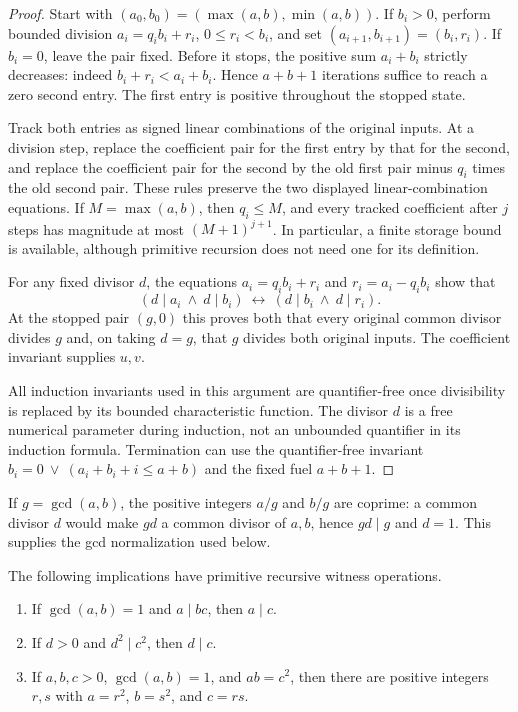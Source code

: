 \begin{proof}
Start with $(a_0,b_0)=(\max(a,b),\min(a,b))$.  If $b_i>0$, perform bounded
division $a_i=q_i b_i+r_i$, $0\leq r_i<b_i$, and set
$(a_{i+1},b_{i+1})=(b_i,r_i)$.  If $b_i=0$, leave the pair fixed.
Before it stops, the positive sum $a_i+b_i$ strictly decreases: indeed
$b_i+r_i<a_i+b_i$.  Hence $a+b+1$ iterations suffice to reach a zero
second entry.  The first entry is positive throughout the stopped state.

Track both entries as signed linear combinations of the original inputs.
At a division step, replace the coefficient pair for the first entry by
that for the second, and replace the coefficient pair for the second by
the old first pair minus $q_i$ times the old second pair.  These rules
preserve the two displayed linear-combination equations.  If
$M=\max(a,b)$, then $q_i\leq M$, and every tracked coefficient after $j$
steps has magnitude at most $(M+1)^{j+1}$.  In particular, a finite storage
bound is available, although primitive recursion does not need one for
its definition.

For any fixed divisor $d$, the equations
$a_i=q_i b_i+r_i$ and $r_i=a_i-q_i b_i$ show that
\[
 (d\mid a_i\ \wedge\ d\mid b_i)
 \ \longleftrightarrow\
 (d\mid b_i\ \wedge\ d\mid r_i).
\]
At the stopped pair $(g,0)$ this proves both that every original common
divisor divides $g$ and, on taking $d=g$, that $g$ divides both original
inputs.  The coefficient invariant supplies $u,v$.

All induction invariants used in this argument are quantifier-free once
divisibility is replaced by its bounded characteristic function.  The
divisor $d$ is a free numerical parameter during induction, not an
unbounded quantifier in its induction formula.  Termination can use the
quantifier-free invariant
$b_i=0\ \vee\ (a_i+b_i+i\leq a+b)$ and the fixed fuel $a+b+1$.
\end{proof}

If $g=\gcd(a,b)$, the positive integers $a/g$ and $b/g$ are coprime:
a common divisor $d$ would make $gd$ a common divisor of $a,b$, hence
$gd\mid g$ and $d=1$.  This supplies the gcd normalization used below.

\begin{lemma}
\label{lem:fq-squares}
The following implications have primitive recursive witness operations.
\begin{enumerate}
\item If $\gcd(a,b)=1$ and $a\mid bc$, then $a\mid c$.
\item If $d>0$ and $d^2\mid c^2$, then $d\mid c$.
\item If $a,b,c>0$, $\gcd(a,b)=1$, and $ab=c^2$, then there are
positive integers $r,s$ with $a=r^2$, $b=s^2$, and $c=rs$.
\end{enumerate}
\end{lemma}

